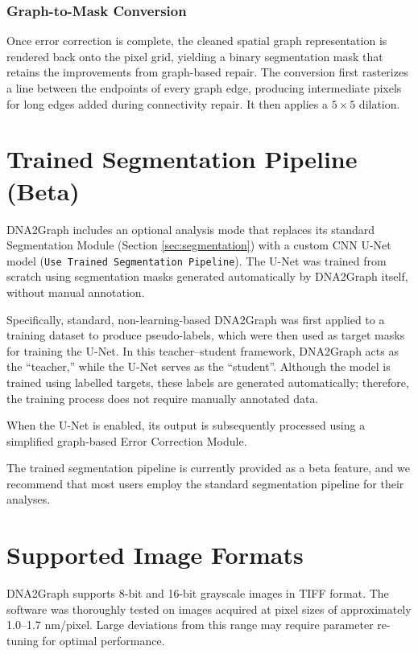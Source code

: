 \documentclass[english,12pt,a4paper]{article}
\begin{document}
	\subsubsection{Graph-to-Mask Conversion} \label{sec:g2m}
	
	Once error correction is complete, the cleaned spatial graph representation is rendered back onto the pixel grid, yielding a binary segmentation mask that retains the improvements from graph-based repair. The conversion first rasterizes a line between the endpoints of every graph edge, producing intermediate pixels for long edges added during connectivity repair. It then applies a $5 \times 5$ dilation.
	
	\section{Trained Segmentation Pipeline (Beta)}
	
	DNA2Graph includes an optional analysis mode that replaces its standard Segmentation Module (Section \ref{sec:segmentation}) with a custom CNN U-Net model (\texttt{Use Trained Segmentation Pipeline}). The U-Net was trained from scratch using segmentation masks generated automatically by DNA2Graph itself, without manual annotation. 
	
	Specifically, standard, non-learning-based DNA2Graph was first applied to a training dataset to produce pseudo-labels, which were then used as target masks for training the U-Net. In this teacher--student framework, DNA2Graph acts as the ``teacher,'' while the U-Net serves as the ``student''. Although the model is trained using labelled targets, these labels are generated automatically; therefore, the training process does not require manually annotated data.
	
	When the U-Net is enabled, its output is subsequently processed
	using a simplified graph-based Error Correction Module. 
	
	The trained segmentation pipeline is currently provided as a beta feature, and we recommend that most users employ
	the standard segmentation pipeline for their analyses.
	
	\newpage
	
	\section{Supported Image Formats}
	
	DNA2Graph supports 8-bit and 16-bit grayscale images in TIFF format. The software was thoroughly tested on images acquired at pixel sizes of approximately 1.0–1.7 nm/pixel.  Large deviations from this range may require parameter re-tuning for optimal performance.
	
\end{document}
